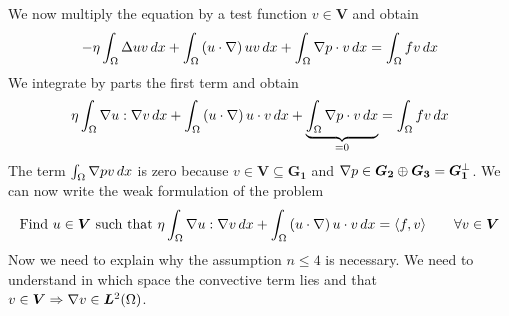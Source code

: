 We now multiply the equation by a test function \(v \in \bm{V}\) and obtain
\[
    \begin{split}
        - \eta \int_\Omega \Delta u v \, dx + \int_\Omega \left( u \cdot \nabla \right) u v \, dx + \int_\Omega \nabla p \cdot v \, dx = \int_\Omega f v \, dx
    \end{split}
\]
We integrate by parts the first term and obtain
\[
    \begin{split}
        \eta \int_\Omega \nabla u : \nabla v \, dx + \int_\Omega \left( u \cdot \nabla \right) u \cdot v \, dx + \underbrace{\int_\Omega \nabla p \cdot v \, dx}_{=0} = \int_\Omega f v \, dx
    \end{split}
\]
The term \(\int_\Omega \nabla p v \, dx\) is zero because \(v \in \bm{V} \subseteq \bm{G_1}\) and \(\nabla p \in \bm{G_2} \oplus \bm{G_3} = \bm{G_1}^\perp\). We can now write the weak formulation of the problem
\[
    \begin{split}
        \text{Find } u \in \bm{V} \text{ such that } \eta \int_\Omega \nabla u : \nabla v \, dx + \int_\Omega \left( u \cdot \nabla \right) u \cdot v \, dx = \langle f, v \rangle \qquad \forall v \in \bm{V}
    \end{split}
\]
Now we need to explain why the assumption \(n \leq 4\) is necessary. We need to understand in which space the convective term lies and that \(v \in \bm{V} \Rightarrow \nabla v \in \bm{L}^2(\Omega)\).  

